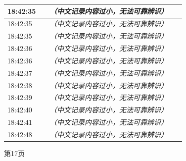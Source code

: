 \documentclass[UTF8,10pt,a4paper,fontset=fandol]{ctexart}
\begin{document}
\begin{minipage}[t]{0.47\linewidth}
\begin{tabular}{|p{0.22\linewidth}|p{0.70\linewidth}|}
18:42:35 & \textit{（中文记录内容过小，无法可靠辨识）} \\ \hline
18:42:35 & \textit{（中文记录内容过小，无法可靠辨识）} \\ \hline
18:42:35 & \textit{（中文记录内容过小，无法可靠辨识）} \\ \hline
18:42:36 & \textit{（中文记录内容过小，无法可靠辨识）} \\ \hline
18:42:36 & \textit{（中文记录内容过小，无法可靠辨识）} \\ \hline
18:42:37 & \textit{（中文记录内容过小，无法可靠辨识）} \\ \hline
18:42:38 & \textit{（中文记录内容过小，无法可靠辨识）} \\ \hline
18:42:39 & \textit{（中文记录内容过小，无法可靠辨识）} \\ \hline
18:42:40 & \textit{（中文记录内容过小，无法可靠辨识）} \\ \hline
18:42:41 & \textit{（中文记录内容过小，无法可靠辨识）} \\ \hline
18:42:48 & \textit{（中文记录内容过小，无法可靠辨识）} \\ \hline
\end{tabular}

\smallskip
第17页
\end{minipage}
\hfill
\end{document}

